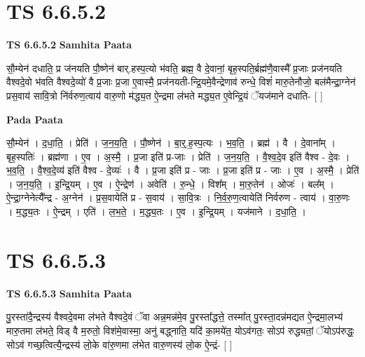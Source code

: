 \documentclass[17pt]{extarticle}
\begin{document}

\section{ TS 6.6.5.2 }

\textbf{TS 6.6.5.2 } \newline
\textbf{Samhita Paata} \newline

सौ॒म्येन॑ दधाति॒ प्र ज॑नयति पौ॒ष्णेन॑ बार्.हस्प॒त्यो भ॑वति॒ ब्रह्म॒ वै दे॒वानां॒ बृह॒स्पति॒र्ब्रह्म॑णै॒वास्मै᳚ प्र॒जाः प्रज॑नयति वैश्वदे॒वो भ॑वति वैश्वदे॒व्यो॑ वै प्र॒जाः प्र॒जा ए॒वास्मै॒ प्रज॑नयती-न्द्रि॒यमे॒वैन्द्रेणाव॑ रुन्धे॒ विशं॑ मारु॒तेनौजो॒ बल॑मैन्द्रा॒ग्नेन॑ प्रस॒वाय॑ सावि॒त्रो नि॑र्वरुण॒त्वाय॑ वारु॒णो म॑द्ध्य॒त ऐ॒न्द्रमा ल॑भते मद्ध्य॒त ए॒वेन्द्रि॒यं ॅयज॑माने दधाति- [  ] \newline

\textbf{Pada Paata} \newline

सौ॒म्येन॑ । द॒धा॒ति॒ । प्रेति॑ । ज॒न॒य॒ति॒ । पौ॒ष्णेन॑ । बा॒र्॒.ह॒स्प॒त्यः । भ॒व॒ति॒ । ब्रह्म॑ । वै । दे॒वाना᳚म् । बृह॒स्पतिः॑ । ब्रह्म॑णा । ए॒व । अ॒स्मै॒ । प्र॒जा इति॑ प्र-जाः । प्रेति॑ । ज॒न॒य॒ति॒ । वै॒श्व॒दे॒व इति॑ वैश्व - दे॒वः । भ॒व॒ति॒ । वै॒श्व॒दे॒व्य॑ इति॑ वैश्व - दे॒व्यः॑ । वै । प्र॒जा इति॑ प्र - जाः । प्र॒जा इति॑ प्र - जाः । ए॒व । अ॒स्मै॒ । प्रेति॑ । ज॒न॒य॒ति॒ । इ॒न्द्रि॒यम् । ए॒व । ऐ॒न्द्रेण॑ । अवेति॑ । रु॒न्धे॒ । विश᳚म् । मा॒रु॒तेन॑ । ओजः॑ । बल᳚म् । ऐ॒न्द्रा॒ग्नेनेत्यै᳚न्द्र - अ॒ग्नेन॑ । प्र॒स॒वायेति॑ प्र - स॒वाय॑ । सा॒वि॒त्रः । नि॒र्व॒रु॒ण॒त्वायेति॑ निर्वरुण - त्वाय॑ । वा॒रु॒णः । म॒द्ध्य॒तः । ऐ॒न्द्रम् । एति॑ । ल॒भ॒ते॒ । म॒द्ध्य॒तः । ए॒व । इ॒न्द्रि॒यम् । यज॑माने । द॒धा॒ति॒ ।  \newline





\section{ TS 6.6.5.3 }

\textbf{TS 6.6.5.3 } \newline
\textbf{Samhita Paata} \newline

पु॒रस्ता॑दै॒न्द्रस्य॑ वैश्वदे॒वमा ल॑भते वैश्वदे॒वं ॅवा अन्न॒मन्न॑मे॒व पु॒रस्ता᳚द्धत्ते॒ तस्मा᳚त् पु॒रस्ता॒दन्न॑मद्यत ऐ॒न्द्रमा॒लभ्य॑ मारु॒तमा ल॑भते॒ विड् वै म॒रुतो॒ विश॑मे॒वास्मा॒ अनु॑ बद्ध्नाति॒ यदि॑ का॒मये॑त॒ योऽव॑गतः॒ सोऽप॑ रुद्ध्यतां॒ ॅयोऽप॑रुद्धः॒ सोऽव॑ गच्छ॒त्वित्यै॒न्द्रस्य॑ लो॒के वा॑रु॒णमा ल॑भेत वारु॒णस्य॑ लो॒क ऐ॒न्द्रं- [  ] \newline
\end{document}
